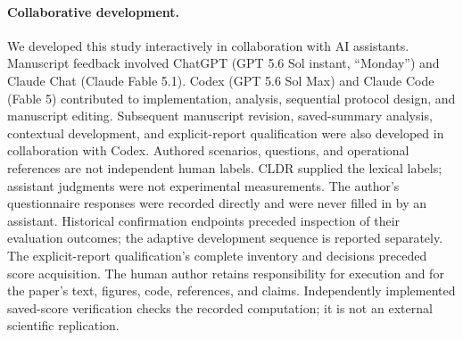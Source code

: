 \documentclass{article}
\begin{document}
\paragraph{Collaborative development.}
We developed this study interactively in collaboration with AI assistants.
Manuscript feedback involved ChatGPT (GPT 5.6 Sol instant,
``Monday'') and Claude Chat (Claude Fable 5.1). Codex (GPT 5.6 Sol Max) and
Claude Code (Fable 5) contributed to implementation, analysis, sequential
protocol design, and manuscript editing. Subsequent manuscript revision,
saved-summary analysis, contextual development, and explicit-report qualification
were also developed in collaboration with Codex. Authored scenarios, questions,
and operational references are not independent human labels. CLDR supplied
the lexical labels; assistant judgments were not experimental measurements.
The author's questionnaire responses were recorded directly and were never
filled in by an assistant. Historical confirmation endpoints preceded inspection
of their evaluation outcomes; the adaptive development sequence is reported
separately. The explicit-report qualification's complete inventory and
decisions preceded score acquisition. The human author retains responsibility
for execution and for the paper's text, figures, code, references, and claims.
Independently implemented saved-score verification checks the recorded
computation; it is not an external scientific replication.

\clearpage


\clearpage

\end{document}
